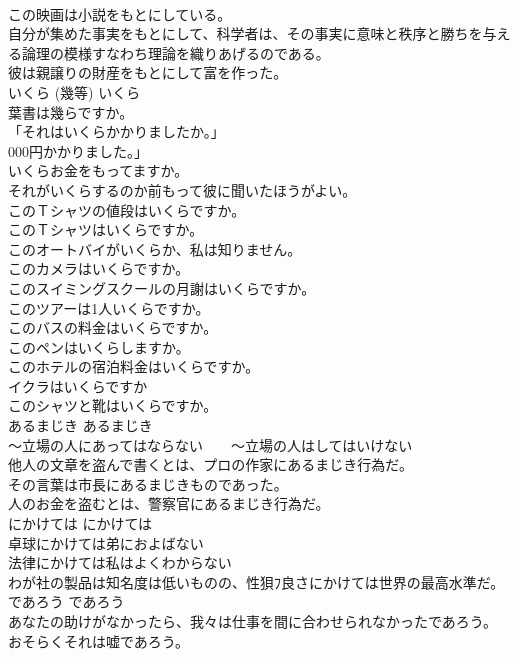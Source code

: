 \documentclass[8pt]{extreport}
\begin{document}
\begin{CJK}{UTF8}{min}
\\	この映画は小説をもとにしている。   
\\	自分が集めた事実をもとにして、科学者は、その事実に意味と秩序と勝ちを与える論理の模様すなわち理論を織りあげるのである。   
\\	彼は親譲りの財産をもとにして富を作った。   
\\	いくら (幾等)	いくら	
\\	葉書は幾らですか。 
\\	「それはいくらかかりましたか。」
\\	000円かかりました。」  
\\	いくらお金をもってますか。  
\\	それがいくらするのか前もって彼に聞いたほうがよい。  
\\	このＴシャツの値段はいくらですか。  
\\	このＴシャツはいくらですか。  
\\	このオートバイがいくらか、私は知りません。  
\\	このカメラはいくらですか。  
\\	このスイミングスクールの月謝はいくらですか。  
\\	このツアーは1人いくらですか。  
\\	このバスの料金はいくらですか。  
\\	このペンはいくらしますか。  
\\	このホテルの宿泊料金はいくらですか。  
\\	イクラはいくらですか  
\\	このシャツと靴はいくらですか。  
\\	あるまじき	あるまじき	
\\	〜立場の人にあってはならない　　〜立場の人はしてはいけない	
\\	他人の文章を盗んで書くとは、プロの作家にあるまじき行為だ。   
\\	その言葉は市長にあるまじきものであった。   
\\	人のお金を盗むとは、警察官にあるまじき行為だ。   
\\	にかけては	にかけては	
\\	卓球にかけては弟におよばない  
\\	法律にかけては私はよくわからない  
\\	わが社の製品は知名度は低いものの、性狽ﾌ良さにかけては世界の最高水準だ。  
\\	であろう	であろう	
\\	あなたの助けがなかったら、我々は仕事を間に合わせられなかったであろう。  
\\	おそらくそれは嘘であろう。  

\end{CJK}
\end{document}
